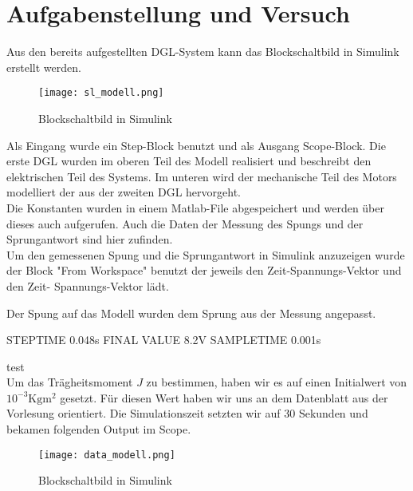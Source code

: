 \section{Aufgabenstellung und Versuch}

Aus den bereits aufgestellten DGL-System kann das Blockschaltbild in Simulink
erstellt werden.

\begin{figure}[H]
    \centering
    \texttt{[image: sl\_modell.png]}
    \caption{Blockschaltbild in Simulink}
    \label{fig:Blockschaltbild}
\end{figure}

Als Eingang wurde ein Step-Block benutzt und als Ausgang Scope-Block.
Die erste DGL wurden im oberen Teil des Modell realisiert und beschreibt
den elektrischen Teil des Systems. Im unteren wird der mechanische Teil
des Motors modelliert der aus der zweiten DGL hervorgeht.\\

Die Konstanten wurden in einem Matlab-File abgespeichert und werden über
dieses auch aufgerufen. Auch die Daten der Messung des Spungs und der
Sprungantwort sind hier zufinden.\\

Um den gemessenen Spung und die Sprungantwort in Simulink anzuzeigen wurde der Block
"From Workspace" benutzt der jeweils den Zeit-Spannungs-Vektor und den Zeit-
Spannungs-Vektor lädt.

Der Spung auf das Modell wurden dem Sprung aus der Messung angepasst.

STEPTIME 0.048s
FINAL VALUE 8.2V
SAMPLETIME 0.001s

test\\

Um das Trägheitsmoment $J$ zu bestimmen, haben wir es auf einen Initialwert
von $10^{-3}\mathrm{Kg m^2}$ gesetzt. Für diesen Wert haben wir uns an dem
Datenblatt aus der Vorlesung orientiert. Die Simulationszeit setzten wir auf
30 Sekunden und bekamen folgenden Output im Scope.

\begin{figure}[H]
    \centering
    \texttt{[image: data\_modell.png]}
    \caption{Blockschaltbild in Simulink}
    \label{fig:Blockschaltbild}
\end{figure}


